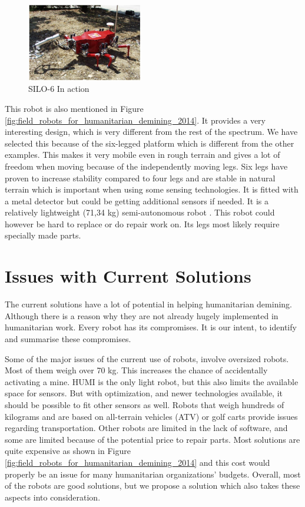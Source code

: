\begin{figure}
    \centering
      \includegraphics[width=0.45\textwidth]{00 - Images/silo_6_in_action.jpg}
  \caption{SILO-6 In action \cite{6LeggedRobot2007}}
  \label{fig:silo_6_in_action}
\end{figure}
This robot is also mentioned in Figure \ref{fig:field_robots_for_humanitarian_demining_2014}. It provides a very interesting design, which is very different from the rest of the spectrum. We have selected this because of the six-legged platform which is different from the other examples. This makes it very mobile even in rough terrain and gives a lot of freedom when moving because of the independently moving legs. Six legs have proven to increase stability compared to four legs and are stable in natural terrain which is important when using some sensing technologies. It is fitted with a metal detector but could be getting additional sensors if needed. It is a relatively lightweight (71,34 kg) semi-autonomous robot \cite{6LeggedRobot2007}. This robot could however be hard to replace or do repair work on. Its legs most likely require specially made parts.  

\section{Issues with Current Solutions}

The current solutions have a lot of potential in helping humanitarian demining. Although there is a reason why they are not already hugely implemented in humanitarian work. Every robot has its compromises. It is our intent, to identify and summarise these compromises.

Some of the major issues of the current use of robots, involve oversized robots. Most of them weigh over 70 kg. This increases the chance of accidentally activating a mine. HUMI is the only light robot, but this also limits the available space for sensors. But with optimization, and newer technologies available, it should be possible to fit other sensors as well. Robots that weigh hundreds of kilograms and are based on all-terrain vehicles (ATV) or golf carts provide issues regarding transportation. Other robots are limited in the lack of software, and some are limited because of the potential price to repair parts. Most solutions are quite expensive as shown in Figure \ref{fig:field_robots_for_humanitarian_demining_2014} and this cost would properly be an issue for many humanitarian organizations’ budgets. Overall, most of the robots are good solutions, but we propose a solution which also takes these aspects into consideration.